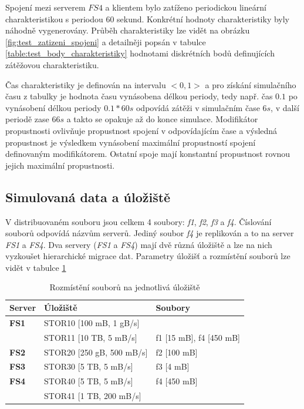 \documentclass[czech,DP]{thesiskiv}
\begin{document}
Spojení mezi serverem $FS4$ a klientem bylo zatíženo periodickou lineární charakteristikou s periodou 60 sekund. Konkrétní hodnoty charakteristiky byly náhodně vygenerovány. Průběh charakteristiky lze vidět na obrázku \ref{fig:test_zatizeni_spojeni} a detailněji popsán v tabulce \ref{table:test_body_charakteristiky} hodnotami diskrétních bodů definujících zátěžovou charakteristiku. 

Čas charakteristiky je definován na intervalu $<0, 1>$ a pro získání simulačního času z tabulky je hodnota času vynásobena délkou periody, tedy např. čas $0.1$ po vynásobení délkou periody $0.1 * 60s$ odpovídá zátěži v simulačním čase $6s$, v další periodě zase $66s$ a takto se opakuje až do konce simulace. Modifikátor propustnosti ovlivňuje propustnost spojení v odpovídajícím čase a výsledná propustnost je výsledkem vynásobení maximální propustností spojení definovaným modifikátorem. Ostatní spoje mají konstantní propustnost rovnou jejich maximální propustnosti. 

\subsection{Simulovaná data a úložiště}

V distribuovaném souboru jsou celkem 4 soubory: \textit{f1}, \textit{f2}, \textit{f3} a \textit{f4}. Číslování souborů odpovídá názvům serverů. Jediný soubor \textit{f4} je replikován a to na server \textit{FS1} a \textit{FS4}. Dva servery (\textit{FS1} a \textit{FS4}) mají dvě různá úložiště a lze na nich vyzkoušet hierarchické migrace dat. Parametry úložišť a rozmístění souborů lze vidět v tabulce \ref{table:test_data_uloziste}

\begin{table}[]
\centering
\caption{Rozmístění souborů na jednotlivá úložiště}
\label{table:test_data_uloziste}
\begin{tabular}{|l|l|l|}
\hline
\textbf{Server} & \textbf{Úložiště}             & \textbf{Soubory} \\ \hline
\textbf{FS1}    & STOR10 {[}100 mB, 1 gB/s{]}   &                  \\ \hline
                & STOR11 {[}10 TB, 5 mB/s{]}    & f1 [15 mB], f4 [450 mB]            \\ \hline
\textbf{FS2}    & STOR20 {[}250 gB, 500 mB/s{]} & f2 [100 mB]              \\ \hline
\textbf{FS3}    & STOR30 {[}5 TB, 5 mB/s{]}     & f3 [4 mB]              \\ \hline
\textbf{FS4}    & STOR40 {[}5 TB, 5 mB/s{]}     & f4 [450 mB]              \\ \hline
                & STOR41 {[}1 TB, 200 mB/s{]}   &                  \\ \hline
\end{tabular}
\end{table}
\end{document}
